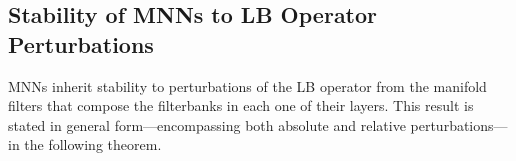 



\subsection{Stability of MNNs to LB Operator Perturbations}
\label{subsec:stability_mnn_abs}

MNNs inherit stability to perturbations of the LB operator from the manifold filters that compose the filterbanks in each one of their layers. This result is stated in general form---encompassing both absolute and relative perturbations---in the following theorem.

